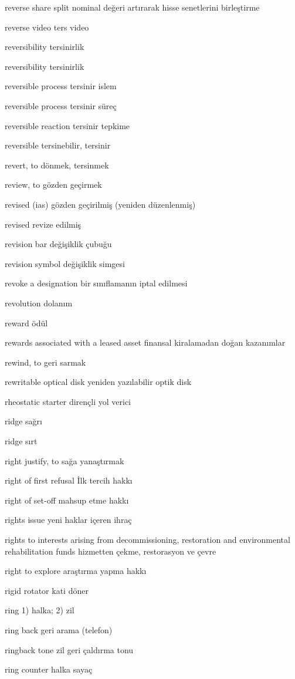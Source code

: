 \documentclass[12pt,fleqn]{article}\usepackage{../../common}
\begin{document}
reverse share split nominal değeri artırarak hisse senetlerini birleştirme

reverse video ters video

reversibility tersinirlik

reversibility tersinirlik

reversible process tersinir islem

reversible process tersinir süreç

reversible reaction tersinir tepkime

reversible tersinebilir, tersinir

revert, to dönmek, tersinmek

review, to gözden geçirmek

revised (ias) gözden geçirilmiş (yeniden düzenlenmiş)

revised revize edilmiş

revision bar değişiklik çubuğu

revision symbol değişiklik simgesi

revoke a designation bir sınıflamanın iptal edilmesi

revolution dolanım

reward ödül

rewards associated with a leased asset finansal kiralamadan doğan kazanımlar

rewind, to geri sarmak

rewritable optical disk yeniden yazılabilir optik disk

rheostatic starter dirençli yol verici

ridge sağrı

ridge sırt

right justify, to sağa yanaştırmak

right of first refusal İlk tercih hakkı

right of set-off mahsup etme hakkı

rights issue yeni haklar içeren ihraç

rights to interests arising from decommissioning, restoration and environmental rehabilitation funds hizmetten çekme, restorasyon ve çevre

right to explore araştırma yapma hakkı

rigid rotator kati döner

ring 1) halka; 2) zil

ring back geri arama (telefon)

ringback tone zil geri çaldırma tonu

ring counter halka sayaç
\end{document}
